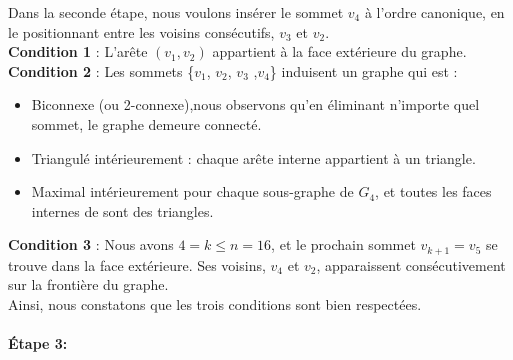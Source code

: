 \documentclass[hidelinks,letterpaper,12pt]{article}
\begin{document}
Dans la seconde étape, nous voulons insérer le sommet $v_4$ à l'ordre canonique, en le positionnant entre les voisins consécutifs, $v_3$ et $v_2$.
\\
\textbf{Condition 1} : L'arête \( (v_1,v_2) \) appartient à la face extérieure du graphe.
\\
\textbf{Condition 2} : Les sommets \{$v_1$, $v_2$, $v_3$ ,$v_4$\} induisent un graphe qui est :
\begin{itemize}
\item Biconnexe (ou 2-connexe),nous observons qu'en éliminant n'importe quel sommet, le graphe demeure connecté.
\item Triangulé intérieurement : chaque arête interne appartient à un triangle.
\item Maximal intérieurement pour chaque sous-graphe de $G_4$, et toutes les faces internes de sont des triangles.
\end{itemize}
\textbf{Condition 3} : Nous avons $4=k \leq n=16$, et le prochain sommet $v_{k+1}=v_5$ se trouve dans la face extérieure. Ses voisins, $v_4$ et $v_2$, apparaissent consécutivement sur la frontière du graphe.
\\
Ainsi, nous constatons que les trois conditions sont bien respectées.
\\ \\
\textbf{Étape 3:}
\end{document}
